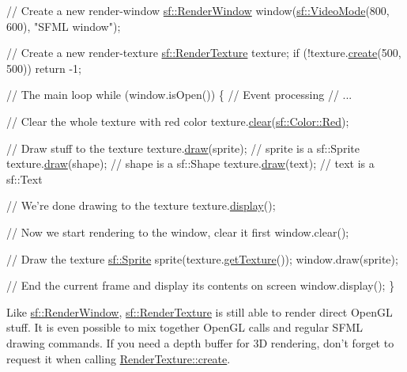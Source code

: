 \begin{DoxyCode}
\textcolor{comment}{// Create a new render-window}
\hyperlink{classsf_1_1RenderWindow}{sf::RenderWindow} window(\hyperlink{classsf_1_1VideoMode}{sf::VideoMode}(800, 600), \textcolor{stringliteral}{"SFML window"});

\textcolor{comment}{// Create a new render-texture}
\hyperlink{classsf_1_1RenderTexture}{sf::RenderTexture} texture;
\textcolor{keywordflow}{if} (!texture.\hyperlink{classsf_1_1RenderTexture_aefbb76eb3b87e368ab974b2660931ccb}{create}(500, 500))
    \textcolor{keywordflow}{return} -1;

\textcolor{comment}{// The main loop}
\textcolor{keywordflow}{while} (window.isOpen())
\{
   \textcolor{comment}{// Event processing}
   \textcolor{comment}{// ...}

   \textcolor{comment}{// Clear the whole texture with red color}
   texture.\hyperlink{classsf_1_1RenderTarget_a6bb6f0ba348f2b1e2f46114aeaf60f26}{clear}(\hyperlink{classsf_1_1Color_a127dbf55db9c07d0fa8f4bfcbb97594a}{sf::Color::Red});

   \textcolor{comment}{// Draw stuff to the texture}
   texture.\hyperlink{classsf_1_1RenderTarget_a12417a3bcc245c41d957b29583556f39}{draw}(sprite);  \textcolor{comment}{// sprite is a sf::Sprite}
   texture.\hyperlink{classsf_1_1RenderTarget_a12417a3bcc245c41d957b29583556f39}{draw}(shape);   \textcolor{comment}{// shape is a sf::Shape}
   texture.\hyperlink{classsf_1_1RenderTarget_a12417a3bcc245c41d957b29583556f39}{draw}(text);    \textcolor{comment}{// text is a sf::Text}

   \textcolor{comment}{// We're done drawing to the texture}
   texture.\hyperlink{classsf_1_1RenderTexture_af92886d5faef3916caff9fa9ab32c555}{display}();

   \textcolor{comment}{// Now we start rendering to the window, clear it first}
   window.clear();

   \textcolor{comment}{// Draw the texture}
   \hyperlink{classsf_1_1Sprite}{sf::Sprite} sprite(texture.\hyperlink{classsf_1_1RenderTexture_a95bc5152c497066d31fdc57da8e17678}{getTexture}());
   window.draw(sprite);

   \textcolor{comment}{// End the current frame and display its contents on screen}
   window.display();
\}
\end{DoxyCode}


Like \hyperlink{classsf_1_1RenderWindow}{sf\-::\-Render\-Window}, \hyperlink{classsf_1_1RenderTexture}{sf\-::\-Render\-Texture} is still able to render direct Open\-G\-L stuff. It is even possible to mix together Open\-G\-L calls and regular S\-F\-M\-L drawing commands. If you need a depth buffer for 3\-D rendering, don't forget to request it when calling \hyperlink{classsf_1_1RenderTexture_aefbb76eb3b87e368ab974b2660931ccb}{Render\-Texture\-::create}.

